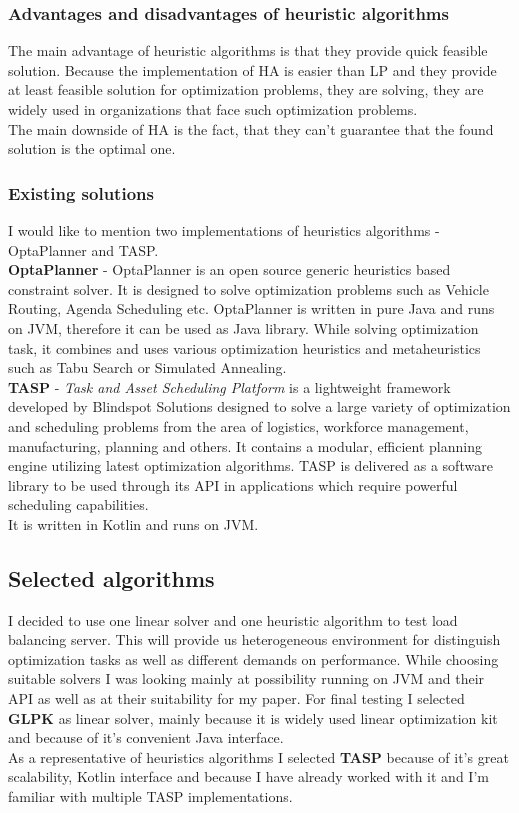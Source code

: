\subsubsection{Advantages and disadvantages of heuristic algorithms}
The main advantage of heuristic algorithms is that they provide quick feasible solution.
Because the implementation of HA is easier than LP and they provide at least feasible solution for optimization problems,
they are solving, they are widely used in organizations that face such optimization problems.\\
The main downside of HA is the fact, that they can't guarantee that the found solution is the optimal one.


\subsubsection{Existing solutions}\label{subsec:existing-solutions-heur}
I would like to mention two implementations of heuristics algorithms - OptaPlanner and TASP\@.\\

\textbf{OptaPlanner} - OptaPlanner is an open source generic heuristics based constraint solver.
It is designed to solve optimization problems such as Vehicle Routing, Agenda Scheduling etc.
OptaPlanner is written in pure Java and runs on JVM, therefore it can be used as Java library.
While solving optimization task, it combines and uses various optimization heuristics and metaheuristics such as
Tabu Search or Simulated Annealing.\\

\textbf{TASP} - \textit{Task and Asset Scheduling Platform}  is a lightweight framework developed by Blindspot Solutions designed to solve a large
variety of optimization and scheduling problems from the area of logistics, workforce management, manufacturing, planning and others.
It contains a modular, efficient planning engine utilizing latest optimization algorithms.
TASP is delivered as a software library to be used through its API in applications which require powerful scheduling capabilities.\\
It is written in Kotlin and runs on JVM\@.

\subsection{Selected algorithms}\label{subsec:selected-algorithms}
I decided to use one linear solver and one heuristic algorithm to test load balancing server.
This will provide us heterogeneous environment for distinguish optimization tasks as well as different demands on performance.
While choosing suitable solvers I was looking mainly at possibility running on JVM and their API as well as at their suitability for my paper.
For final testing I selected \textbf{GLPK} as linear solver, mainly because it is widely used linear optimization kit
and because of it's convenient Java interface.\\
As a representative of heuristics algorithms I selected \textbf{TASP} because of it's great scalability, Kotlin interface
and because I have already worked with it and I'm familiar with multiple TASP implementations.
